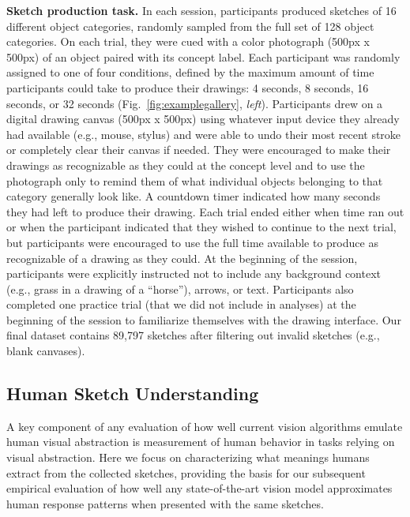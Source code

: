 \documentclass{article}
\begin{document}
\textbf{Sketch production task.} In each session, participants produced sketches of 16 different object categories, randomly sampled from the full set of 128 object categories.
On each trial, they were cued with a color photograph (500px x 500px) of an object paired with its concept label. 
Each participant was randomly assigned to one of four conditions, defined by the maximum amount of time participants could take to produce their drawings: 4 seconds, 8 seconds, 16 seconds, or 32 seconds (Fig.~\ref{fig:examplegallery}, \textit{left}). 
Participants drew on a digital drawing canvas (500px x 500px) using whatever input device they already had available (e.g., mouse, stylus) and were able to undo their most recent stroke or completely clear their canvas if needed. 
They were encouraged to make their drawings as recognizable as they could at the concept level and to use the photograph only to remind them of what individual objects belonging to that category generally look like.  
A countdown timer indicated how many seconds they had left to produce their drawing. 
Each trial ended either when time ran out or when the participant indicated that they wished to continue to the next trial, but participants were encouraged to use the full time available to produce as recognizable of a drawing as they could.
At the beginning of the session, participants were explicitly instructed not to include any background context (e.g., grass in a drawing of a ``horse''), arrows, or text.
Participants also completed one practice trial (that we did not include in analyses) at the beginning of the session to familiarize themselves with the drawing interface.
Our final dataset contains 89,797 sketches after filtering out invalid sketches (e.g., blank canvases).

\subsection{Human Sketch Understanding}

A key component of any evaluation of how well current vision algorithms emulate human visual abstraction is measurement of human behavior in tasks relying on visual abstraction. 
Here we focus on characterizing what meanings humans extract from the collected sketches, providing the basis for our subsequent empirical evaluation of how well any state-of-the-art vision model approximates human response patterns when presented with the same sketches.  

\end{document}
